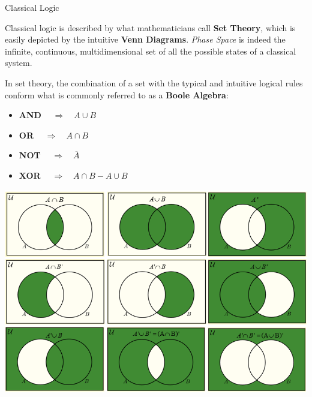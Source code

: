 \documentclass[9pt, handout, aspectratio=169]{beamer}		%
\begin{document}
	\begin{frame}{Classical Logic}

		Classical logic is described by what mathematicians call \textbf{Set Theory}, which is easily depicted by the intuitive \textbf{Venn Diagrams}. \emph{Phase Space} is indeed the infinite, continuous, multidimensional set of all the possible states of a classical system.

		\medskip

		In set theory, the combination of a set with the typical and intuitive logical rules conform what is commonly referred to as a \textbf{Boole Algebra}:

		\begin{multicols}{2}

		\begin{itemize}
			\item \textbf{AND} $\quad \Rightarrow \quad A \cup B$
			\item \textbf{OR} $\quad \Rightarrow \quad A \cap B$
			\item \textbf{NOT} $\quad \Rightarrow \quad \overline{A}$
			\item \textbf{XOR} $ \quad \Rightarrow \quad A \cap B - A \cup B$
		\end{itemize}

			\columnbreak
			\begin{center}
		\includegraphics[width=.34\paperwidth]{Figures/Venn_Diagrams}
			\end{center}

		\end{multicols}

	\end{frame}
\end{document}
